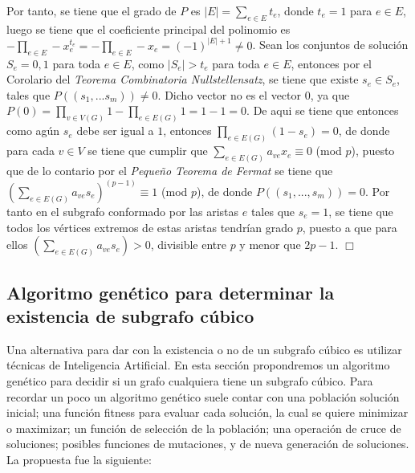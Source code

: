 \documentclass{article}
\begin{document}
Por tanto, se tiene que el grado de $P$ es $|E| = \sum_{e \in E} t_e$, donde $t_e = 1$ para $e \in E$, luego se tiene que el 
coeficiente principal del polinomio es $- \prod_{e \in E}  - x_e^{t_e} = - \prod_{e \in E} - x_e = (-1)^{|E| + 1} \neq 0$. Sean los 
conjuntos de soluci\'on $S_e = {0,1}$ para toda $e \in E$, como $|S_e| > t_e$ para toda $e \in E$, entonces por el Corolario del \textit{Teorema Combinatoria Nullstellensatz}, se tiene 
que existe $s_e \in S_e$, tales que $P((s_1,...s_m))  \neq 0$. Dicho vector no es el vector $0$, ya que $P(0) = \prod_{v \in V(G)}  1 - \prod_{e \in E(G)} 1 = 1 - 1 = 0$. De aqui se tiene que entonces 
como ag\'un $s_e$ debe ser igual a $1$, entonces $\prod_{e \in E(G)} (1 - s_e) = 0$, de donde para cada $v \in V$ se tiene que cumplir que 
$\sum_{e \in E(G)} a_{ve} x_e \equiv 0$ (mod $p$), puesto que de lo contario por el \textit{Peque\~no Teorema de Fermat} se tiene que $(\sum_{e \in E(G)} a_{ve} s_e)^(p-1) \equiv 1$ (mod $p$), de donde 
$P((s_1,...,s_m)) = 0 $. Por tanto en el subgrafo conformado por las aristas $e$ tales que $s_e = 1$, se tiene que todos los v\'ertices extremos de estas aristas tendr\'ian grado $p$, puesto a que para ellos
$(\sum_{e \in E(G)} a_{ve} s_e) > 0$, divisible entre $p$ y menor que $2p-1$. $\Box $


\subsection*{Algoritmo gen\'etico para determinar la existencia de subgrafo c\'ubico}

Una alternativa para dar con la existencia o no de un subgrafo cúbico es utilizar técnicas de Inteligencia Artificial. En esta sección propondremos un algoritmo genético para decidir si un grafo cualquiera tiene un subgrafo cúbico. Para recordar un poco un algoritmo genético suele contar con una población solución inicial; una función fitness para evaluar cada solución, la cual se quiere minimizar o maximizar; un función de selección de la población; una operación de cruce de soluciones; posibles funciones de mutaciones, y de nueva generación de soluciones. La propuesta fue la siguiente:
\end{document}
